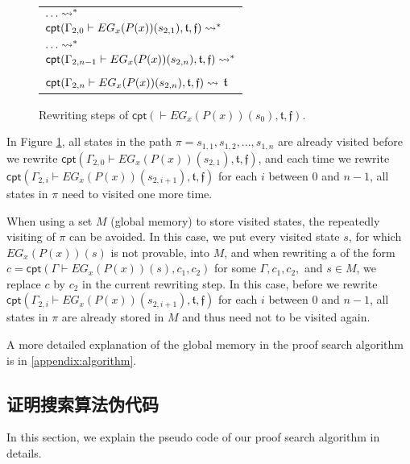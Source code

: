 {\begin{example}
\begin{figure}[h!]
\begin{tabular}{|l|}
				$\ldots\rightsquigarrow^*$\\
				$\textsf{cpt}(\Gamma_{2,0}\vdash EG_x(P(x))(s_{2,1}), \mathfrak{t},\mathfrak{f})\rightsquigarrow^*$\\
				$\ldots\rightsquigarrow^*$\\
				$\textsf{cpt}(\Gamma_{2,n-1}\vdash EG_x(P(x))(s_{2,n}), \mathfrak{t},\mathfrak{f})\rightsquigarrow^*$\\
				$\textsf{cpt}(\Gamma_{2,n}\vdash EG_x(P(x))(s_{2,n}), \mathfrak{t},\mathfrak{f})\rightsquigarrow$
				$\mathfrak{t}$\\
				\hline
			\end{tabular}
			\caption{Rewriting steps of $\textsf{cpt}(\vdash EG_x(P(x))(s_0),\mathfrak{t},\mathfrak{f})$.}
			\label{example:globalmerge:fig}
		\end{figure}
		
		In Figure \ref{example:globalmerge:fig}, all states in the path $\pi = s_{1,1},s_{1,2},...,s_{1,n}$ are already visited before we rewrite $\textsf{cpt}(\Gamma_{2,0}\vdash EG_x(P(x))(s_{2,1}), \mathfrak{t},\mathfrak{f})$, and each time we rewrite $\textsf{cpt}(\Gamma_{2,i}\vdash EG_x(P(x))(s_{2,i+1}), \mathfrak{t},\mathfrak{f})$ for each $i$ between $0$ and $n-1$, all states in $\pi$ need to visited one more time. 
		
		When using a set $M$ (global memory) to store visited states, the repeatedly visiting of $\pi$ can be avoided. In this case, we put every visited state $s$, for which $EG_x(P(x))(s)$ is not provable, into $M$, and when rewriting a \CPT{} of the form $c=\textsf{cpt}(\Gamma\vdash EG_x(P(x))(s), c_1, c_2)$ for some $\Gamma, c_1, c_2,$ and $s\in M$, we replace $c$ by $c_2$ in the current rewriting step. In this case, before we rewrite $\textsf{cpt}(\Gamma_{2,i}\vdash EG_x(P(x))(s_{2,i+1}), \mathfrak{t},\mathfrak{f})$ for each $i$ between $0$ and $n-1$, all states in $\pi$ are already stored in $M$ and thus need not to be visited again.
		
		A more detailed explanation of the global memory in the proof search algorithm is in \ref{appendix:algorithm}.
	\end{example}
}

\subsection{证明搜索算法伪代码}\label{algorithm:pseducode}
In this section, we explain the pseudo code of our proof search algorithm in details.

